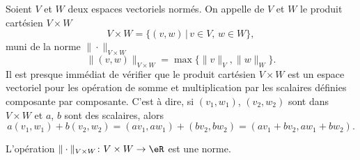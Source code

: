 Soient $V$ et $W$ deux espaces vectoriels normés. On appelle  de $V$ et $W$ le produit cartésien $V\times W$ 
\begin{equation}
V\times W=\{(v,w)\,|\, v\in V,\, w\in W\},
\end{equation}
muni de la norme $\|\cdot \|_{V\times W}$
\begin{equation}	\label{EqNormeVxWmax}
	\|(v,w) \|_{V\times W}=\max\{\|v\|_{V},\|w\|_W\}.
\end{equation}
Il est presque immédiat de vérifier que le produit cartésien $V\times W$ est un espace vectoriel pour les opération de somme et multiplication par les scalaires définies composante par composante. C'est à dire,  si $(v_1,w_1)$, $(v_2,w_2)$ sont dans $V\times W$ et $a$, $b$ sont des scalaires, alors  
\begin{equation}
 a (v_1,w_1)+ b(v_2,w_2)=(av_1,aw_1)+ (bv_2,bw_2)=(av_1+bv_2,aw_1+bw_2).
\end{equation}

\begin{lemma}
	L'opération $\|\cdot \|_{V\times W}\colon V\times W\to \eR$ est une norme.
\end{lemma}

